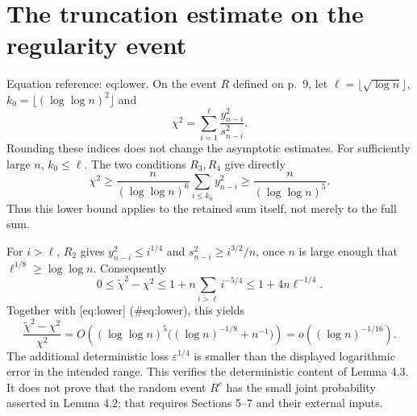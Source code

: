 \documentclass[10pt]{article}
\begin{document}
\section*{The truncation estimate on the regularity event}
Equation reference: eq:lower. On the event \(R\) defined on p. 9, let \(\ell=\lfloor\sqrt{\log n}\rfloor\), \(k_0=\lfloor(\log\log n)^2\rfloor\) and \[\chi^2=\sum_{i=1}^{\ell}\frac{y_{n-i}^2}{s_{n-i}^2}.\] Rounding these indices does not change the asymptotic estimates. For sufficiently large \(n\), \(k_0\leq\ell\). The two conditions \(R_3,R_4\) give directly \[\chi^2\geq \frac{n}{(\log\log n)^6}
                  \sum_{i\leq k_0}y_{n-i}^2
       \geq \frac{n}{(\log\log n)^5}.
 \] Thus this lower bound applies to the retained sum itself, not merely to the full sum.\par
For \(i>\ell\), \(R_2\) gives \(y_{n-i}^2\leq i^{1/4}\) and \(s_{n-i}^2\geq i^{3/2}/n\), once \(n\) is large enough that \(\ell^{1/8}\geq\log\log n\). Consequently \[0\leq \widetilde\chi^2-\chi^2
 \leq1+n\sum_{i>\ell}i^{-5/4}
 \leq1+4n\ell^{-1/4}.\] Together with [eq:lower] (\#eq:lower), this yields \[\frac{\widetilde\chi^2-\chi^2}{\chi^2}
 =O\!\left((\log\log n)^5
       \big((\log n)^{-1/8}+n^{-1}\big)\right)
 =o((\log n)^{-1/16}).\] The additional deterministic loss \(\varepsilon^{1/4}\) is smaller than the displayed logarithmic error in the intended range. This verifies the deterministic content of Lemma 4.3. It does not prove that the random event \(R^c\) has the small joint probability asserted in Lemma 4.2; that requires Sections 5–7 and their external inputs.\par
\end{document}
